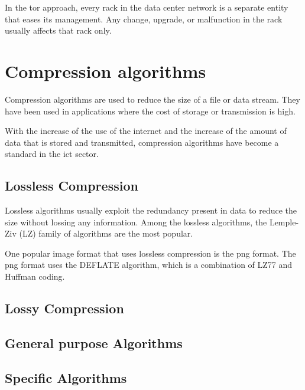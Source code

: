 In the \ac{tor} approach, every rack in the data center network is a separate entity that eases its management. Any change, upgrade, or malfunction in the rack usually affects that rack only.

\section{Compression algorithms}

Compression algorithms are used to reduce the size of a file or data stream. They have been used in applications where the cost of storage or transmission is high.

With the increase of the use of the internet and the increase of the amount of data that is stored and transmitted, compression algorithms have become a standard in the \ac{ict} sector.

\subsection{Lossless Compression}

Lossless algorithms usually exploit the redundancy present in data to reduce the size without lossing any information. Among the lossless algorithms, the Lemple-Ziv (LZ) family of algorithms are the most popular.

One popular image format that uses lossless compression is the \ac{png} format. The \ac{png} format uses the DEFLATE algorithm, which is a combination of LZ77 and Huffman coding.

\subsection{Lossy Compression}

\subsection{General purpose Algorithms}

\subsection{Specific Algorithms}











